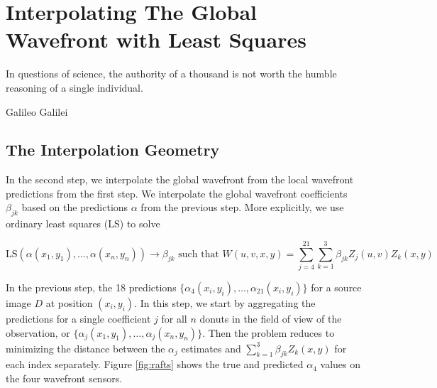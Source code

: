 \chapter{Interpolating The Global Wavefront with Least Squares}
\label{chap:interp}

\epigraph{In questions of science, the authority of a thousand is not worth the humble reasoning of a single individual.}{Galileo Galilei}

\section{The Interpolation Geometry}

In the second step, we interpolate the global wavefront from the local wavefront predictions from the first step. We interpolate the global wavefront coefficients $\beta_{jk}$ based on the predictions $\alpha$ from the previous step. More explicitly, we use ordinary least squares (LS) to solve

\begin{equation*}
\text{LS}(\alpha(x_1,y_1), \dots, \alpha(x_n,y_n)) \to \beta_{jk} \text{ such that } W(u,v,x,y) = \sum_{j=4}^{21}\sum_{k=1}^3\beta_{jk}Z_j(u,v)Z_k(x,y)
\end{equation*}

In the previous step, the 18 predictions $\{\alpha_4(x_i, y_i), \dots, \alpha_{21}(x_i,y_i)\}$ for a source image $D$ at position $(x_i,y_i)$. In this step, we start by aggregating the predictions for a single coefficient $j$ for all $n$ donuts in the field of view of the observation, or $\{\alpha_j(x_1, y_1), \dots, \alpha_{j}(x_n,y_n)\}$. Then the problem reduces to minimizing the distance between the $\alpha_j$ estimates and $\sum_{k=1}^3\beta_{jk}Z_k(x,y)$ for each index separately. Figure \ref{fig:rafts} shows the true and predicted $\alpha_4$ values on the four wavefront sensors. 

